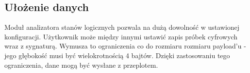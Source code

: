     \subsection{Ułożenie danych}
        Moduł analizatora stanów logicznych pozwala na dużą dowolność w ustawionej konfiguracji.
        Użytkownik może między innymi ustawić zapis próbek cyfrowych wraz z sygnaturą.
        Wymusza to ograniczenia co do rozmiaru rozmiaru payload'u - jego głębokość musi być wielokrotnością 4 bajtów.
        Dzięki zastosowaniu tego ograniczenia, dane mogą być wysłane z przeplotem.
